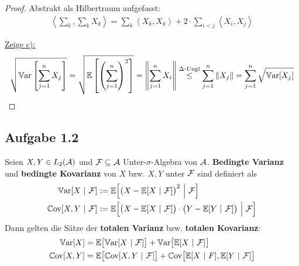 \begin{proof}
	Abstrakt als Hilbertraum aufgefasst:
	\begin{align*}
		\left\langle\sum\limits_{k},\sum\limits_{k} X_k\right\rangle
		=\sum\limits_k\left\langle X_k,X_k\right\rangle+2\cdot\sum\limits_{i<j}\left\langle X_i,X_j\right\rangle
	\end{align*}

	\underline{Zeige c):}
	\begin{align*}
		\sqrt{\mathbb{V}\text{ar}\left[\sum\limits_{j=1}^n X_j\right]}
		=\sqrt{\mathbb{E}\left[\left(\sum\limits_{j=1}^n\right)^2\right]}
		=\left\Vert\sum\limits_{j=1}^n X_i\right\Vert
		\overset{\Delta\text{-Ungl}}{\leq}
		\sum\limits_{j=1}^n\Vert X_j\Vert
		=\sum\limits_{j=1}^n\sqrt{\mathbb{V}\text{ar}[X_j]}
	\end{align*}
\end{proof}

\subsection{Aufgabe 1.2}
Seien $X,Y\in L_2(\mathcal{A})$ und $\mathcal{F}\subseteq\mathcal{A}$ Unter-$\sigma$-Algebra von $\mathcal{A}$. 
\textbf{Bedingte Varianz} und \textbf{bedingte Kovarianz} von $X$ bzw. $X,Y$ unter $\mathcal{F}$ sind definiert als
\begin{align*}
	\mathbb{V}\text{ar}[X~|~\mathcal{F}]&:=\mathbb{E}\Big[\big(X-\mathbb{E}[X~|~\mathcal{F}]\big)^2~\Big|~\mathcal{F}\Big]\\
	\mathbb{C}\text{ov}[X,Y~|~\mathcal{F}]&:=\mathbb{E}\Big[\big(X-\mathbb{E}[X~|~\mathcal{F}]\big)\cdot\big(Y-\mathbb{E}[Y~|~\mathcal{F}]\big)~\Big|~\mathcal{F}\Big]
\end{align*}
Dann gelten die Sätze der \textbf{totalen Varianz} bzw. \textbf{totalen Kovarianz}:
\begin{align*}
	\mathbb{V}\text{ar}[X]&=\mathbb{E}\big[\mathbb{V}\text{ar}[X~|~\mathcal{F}]\big]+\mathbb{V}\text{ar}\big[\mathbb{E}[X~|~\mathcal{F}]\big]\\
	\mathbb{C}\text{ov}[X,Y]&=\mathbb{E}\big[\mathbb{C}\text{ov}[X,Y~|~\mathcal{F}]\big]+\mathbb{C}\text{ov}\big[\mathbb{E}[X~|~F],\mathbb{E}[Y~|~\mathcal{F}]\big]
\end{align*}

